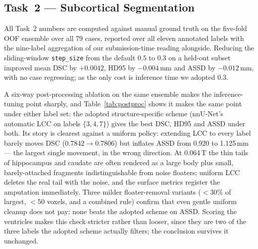 \documentclass[runningheads]{llncs}
\begin{document}
\subsection{Task~2 --- Subcortical Segmentation}
\label{sec:r2}

All Task~2 numbers are computed against manual ground truth on the five-fold OOF
ensemble over all 79 cases, reported over all eleven annotated labels with the
nine-label aggregation of our submission-time reading alongside. Reducing the
sliding-window \texttt{step\_size} from the default $0.5$ to $0.3$ on a held-out
subset improved mean DSC by $+0.0042$, HD95 by $-0.004$\,mm and ASSD by
$-0.012$\,mm, with no case regressing; as the only cost is inference time we
adopted $0.3$.

A six-way post-processing ablation on the same ensemble makes the inference-tuning
point sharply, and Table~\ref{tab:postproc} shows it makes the same point under either
label set: the adopted structure-specific scheme (nnU-Net's automatic LCC on labels
$\{3,4,7\}$) gives the best DSC, HD95 and ASSD under both. Its story is clearest
against a uniform policy: extending LCC to every label barely moves DSC
($0.7842\!\to\!0.7806$) but inflates ASSD from 0.920 to 1.125\,mm --- the largest
single movement, in the wrong direction. At 0.064\,T the thin
tails of hippocampus and caudate are often rendered as a large body plus small,
barely-attached fragments indistinguishable from noise floaters; uniform LCC deletes
the real tail with the noise, and the surface metrics register the amputation
immediately. Three milder floater-removal variants ($<30\%$ of largest, $<50$ voxels,
and a combined rule) confirm that even gentle uniform cleanup does not pay: none beats
the adopted scheme on ASSD. Scoring the ventricles makes this check stricter rather
than looser, since they are two of the three labels the adopted scheme actually
filters; the conclusion survives it unchanged.
\end{document}
